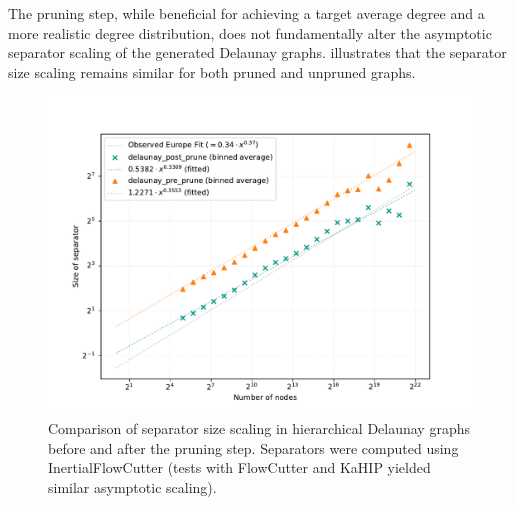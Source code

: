 The pruning step, while beneficial for achieving a target average degree and a more realistic degree distribution, does not fundamentally alter the asymptotic separator scaling of the generated Delaunay graphs.
 illustrates that the separator size scaling remains similar for both pruned and unpruned graphs.

\begin{figure}[tbhp]
	\centering
	\includegraphics[width=0.7\linewidth]{graphics/delaunay_pre_post_pruning_sep_size.pdf}
	\caption{Comparison of separator size scaling in hierarchical Delaunay graphs before and after the pruning step. Separators were computed using InertialFlowCutter (tests with FlowCutter and KaHIP yielded similar asymptotic scaling).}
	\label{fig:delaunay_pruned_vs_pre_pruned_sep}
\end{figure}

